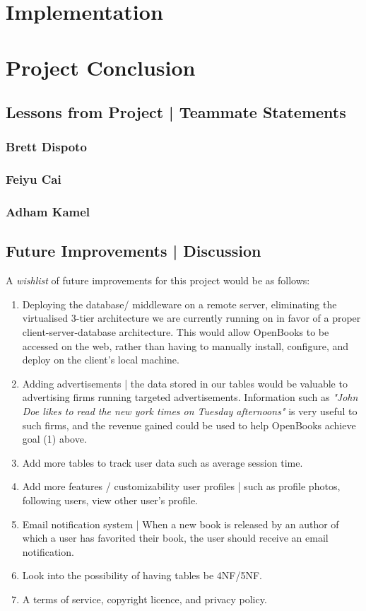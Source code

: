 \documentclass[letter, 12pt, titlepage]{article}
\begin{document}
\section{Implementation}


\section{Project Conclusion}
	
	\subsection{Lessons from Project | Teammate Statements}

	\subsubsection{Brett Dispoto}

	\subsubsection{Feiyu Cai}

	\subsubsection{Adham Kamel}

	\subsection{Future Improvements | Discussion}
		A \textit{wishlist} of future improvements for this project would be as follows:
		\begin{enumerate}
			\item Deploying the database/ middleware on a remote server, eliminating the virtualised 3-tier architecture we are currently running on in favor of a proper client-server-database architecture. This would allow OpenBooks to be accessed on the web, rather than having to manually install, configure, and deploy on the client's local machine.
			\item Adding advertisements | the data stored in our tables would be valuable to advertising firms running targeted advertisements. Information such as \textit{"John Doe likes to read the new york times on Tuesday afternoons"} is very useful to such firms, and the revenue gained could be used to help OpenBooks achieve  goal (1) above.
			\item Add more tables to track user data such as average session time.
			\item Add more features / customizability user profiles |  such as profile photos, following users, view other user's profile.
			\item Email notification system | When a new book is released by an author of which a user has favorited their book, the user should receive an email notification.
			\item Look into the possibility of having tables be 4NF/5NF.
			\item A terms of service, copyright licence, and privacy policy.
		\end{enumerate}
\end{document}
